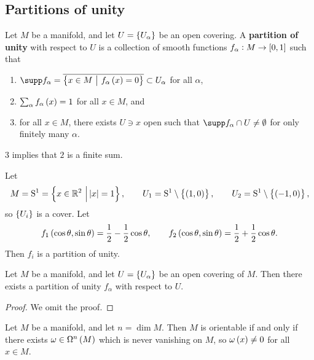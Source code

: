 \pagebreak

\subsection{Partitions of unity}

\begin{definition}
Let $ M $ be a manifold, and let $ U = \cbr{U_\alpha} $ be an open covering. A \textbf{partition of unity} with respect to $ U $ is a collection of smooth functions $ f_\alpha : M \to \sbr{0, 1} $ such that
\begin{enumerate}
\item $ \supp f_\alpha = \overline{\cbr{x \in M \st f_\alpha\br{x} = 0}} \subset U_\alpha $ for all $ \alpha $,
\item $ \sum_\alpha f_\alpha\br{x} = 1 $ for all $ x \in M $, and
\item for all $ x \in M $, there exists $ U \ni x $ open such that $ \supp f_\alpha \cap U \ne \emptyset $ for only finitely many $ \alpha $.
\end{enumerate}
\end{definition}

\begin{remark*}
$ 3 $ implies that $ 2 $ is a finite sum.
\end{remark*}

\begin{example}
Let
$$ M = \S^1 = \cbr{x \in \RR^2 \st \abs{x} = 1}, \qquad U_1 = \S^1 \setminus \cbr{\br{1, 0}}, \qquad U_2 = \S^1 \setminus \cbr{\br{-1, 0}}, $$
so $ \cbr{U_i} $ is a cover. Let
$$ f_1\br{\cos \theta, \sin \theta} = \dfrac{1}{2} - \dfrac{1}{2}\cos \theta, \qquad f_2\br{\cos \theta, \sin \theta} = \dfrac{1}{2} + \dfrac{1}{2}\cos \theta. $$
Then $ f_i $ is a partition of unity.
\end{example}

\begin{proposition}
Let $ M $ be a manifold, and let $ U = \cbr{U_\alpha} $ be an open covering of $ M $. Then there exists a partition of unity $ f_\alpha $ with respect to $ U $.
\end{proposition}

\begin{proof}
We omit the proof.
\end{proof}

\begin{proposition}
\label{prop:1.23}
Let $ M $ be a manifold, and let $ n = \dim M $. Then $ M $ is orientable if and only if there exists $ \omega \in \Omega^n\br{M} $ which is never vanishing on $ M $, so $ \omega\br{x} \ne 0 $ for all $ x \in M $.
\end{proposition}

